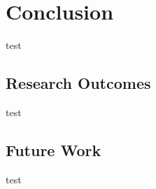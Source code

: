 \chapter{Conclusion}
\label{conclusion}
test

\section{Research Outcomes}
test

\section{Future Work}
test

